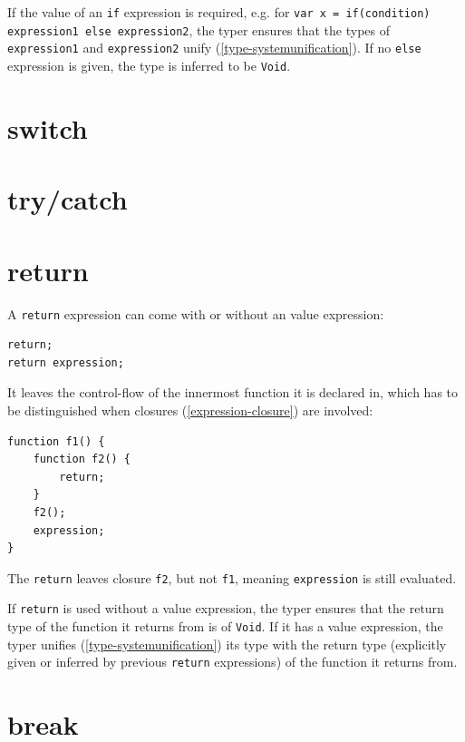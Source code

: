 \documentclass[a4paper,oneside]{book}
\newcommand{\type}[1]{\texttt{#1}}
\newcommand{\expr}[1]{\texttt{#1}}
\newcommand{\tref}[2]{#1 (\ref{#2})}
\begin{document}
If the value of an \expr{if} expression is required, e.g. for \expr{var x = if(condition) expression1 else expression2}, the typer ensures that the types of \expr{expression1} and \expr{expression2} \tref{unify}{type-systemunification}. If no \expr{else} expression is given, the type is inferred to be \type{Void}.


\section{switch}
\label{expression-switch}

\section{try/catch}
\label{expression-try-catch}

\section{return}
\label{expression-return}

A \expr{return} expression can come with or without an value expression:

\begin{lstlisting}
return;
return expression;
\end{lstlisting}

It leaves the control-flow of the innermost function it is declared in, which has to be distinguished when \tref{closures}{expression-closure} are involved:

\begin{lstlisting}
function f1() {
	function f2() {
		return;
	}
	f2();
	expression;
}
\end{lstlisting}

The \expr{return} leaves closure \expr{f2}, but not \expr{f1}, meaning \expr{expression} is still evaluated.

If \expr{return} is used without a value expression, the typer ensures that the return type of the function it returns from is of \type{Void}. If it has a value expression, the typer \tref{unifies}{type-systemunification} its type with the return type (explicitly given or inferred by previous \expr{return} expressions) of the function it returns from.


\section{break}
\label{expression-break}
\end{document}

